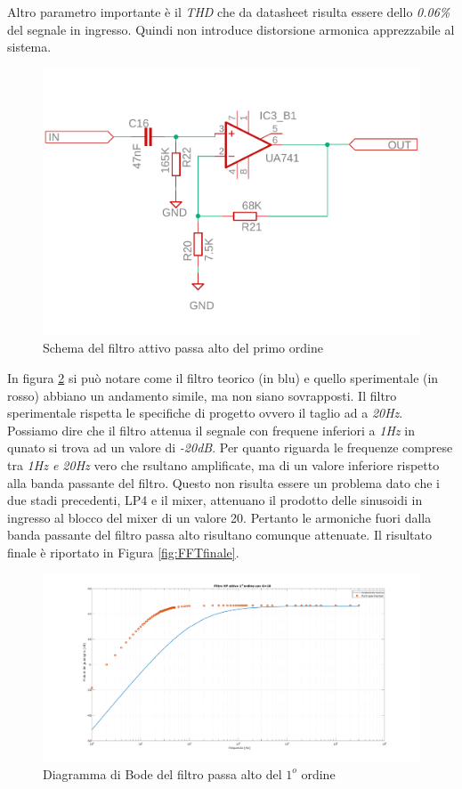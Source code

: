 \documentclass[titlepage]{report}
\begin{document}
	Altro parametro importante è il \textit{THD} che da datasheet risulta essere dello \textit{0.06\%} del segnale in ingresso. Quindi non introduce distorsione armonica apprezzabile al sistema.
	
	\begin{figure}[H]
		\centering
		\includegraphics[scale=0.5]{Immagini/sch_hp1.pdf}
		\caption{Schema del filtro attivo passa alto del primo ordine}
		\label{fig:sch_hp1}
	\end{figure}

	In figura \ref{fig:BODEHp1Real} si può notare come il filtro teorico (in blu) e quello sperimentale (in rosso) abbiano un andamento simile, ma non siano sovrapposti. Il filtro sperimentale rispetta le specifiche di progetto ovvero il taglio ad a \textit{20Hz}. Possiamo dire che il filtro attenua il segnale con frequene inferiori a \textit{1Hz} in qunato si trova ad un valore di \textit{-20dB}. Per quanto riguarda le frequenze comprese tra \textit{1Hz e 20Hz} vero che rsultano amplificate, ma di un valore inferiore rispetto alla banda passante del filtro. Questo non risulta essere un problema dato che i due stadi precedenti, LP4 e il mixer, attenuano il prodotto delle sinusoidi in ingresso al blocco del mixer di un valore 20. Pertanto le armoniche fuori dalla banda passante del filtro passa alto risultano comunque attenuate. Il risultato finale è riportato in Figura \ref{fig:FFTfinale}.

	\begin{figure}[H]
		\centering
		\includegraphics[scale=0.34]{Immagini/bode_hp1_ua741.pdf}
		\caption{Diagramma di Bode del filtro passa alto del $1^o$ ordine}
		\label{fig:BODEHp1Real}
	\end{figure}
\end{document}
